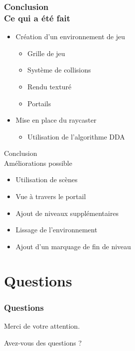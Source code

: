 \documentclass{beamer}
\begin{document}
\begin{frame}
    \frametitle{Conclusion \\
                \small Ce qui a été fait}
    \begin{block}{}
        \begin{itemize}
            \item Création d'un environnement de jeu
            \begin{itemize}
                \item Grille de jeu
                \item Système de collisions
                \item Rendu texturé
                \item Portails
            \end{itemize}
            \item Mise en place du raycaster
            \begin{itemize}
                \item Utilisation de l'algorithme DDA
            \end{itemize}
        \end{itemize}
    \end{block}
\end{frame}

\begin{frame}{Conclusion \\
                \small Améliorations possible}
    \begin{block}{}
        \begin{itemize}
            \item Utilisation de scènes
            \item Vue à travers le portail
            \item Ajout de niveaux supplémentaires
            \item Lissage de l'environnement
            \item Ajout d'un marquage de fin de niveau
        \end{itemize}
    \end{block}
\end{frame}

\section*{Questions}

\begin{frame}
    \frametitle{Questions}
    \begin{block}{}
        \centering
        Merci de votre attention.
        
        Avez-vous des questions ?
    \end{block}
\end{frame}
\end{document}
